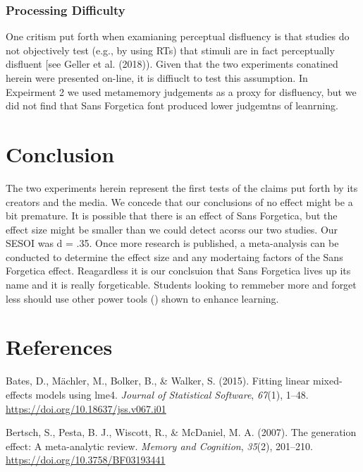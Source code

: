 \documentclass[english,doc]{apa6}
\begin{document}
\hypertarget{processing-difficulty}{%
\subsubsection{Processing Difficulty}\label{processing-difficulty}}

One critism put forth when examianing perceptual disfluency is that studies do not objectively test (e.g., by using RTs) that stimuli are in fact perceptually disfluent {[}see Geller et al. (2018)). Given that the two experiments conatined herein were presented on-line, it is diffiuclt to test this assumption. In Expeirment 2 we used metamemory judgements as a proxy for disfluency, but we did not find that Sans Forgetica font produced lower judgemtns of leanrning.

\hypertarget{conclusion}{%
\section{Conclusion}\label{conclusion}}

The two experiments herein represent the first tests of the claims put forth by its creators and the media. We concede that our conclusions of no effect might be a bit premature. It is possible that there is an effect of Sans Forgetica, but the effect size might be smaller than we could detect acorss our two studies. Our SESOI was d = .35. Once more research is published, a meta-analysis can be conducted to determine the effect size and any modertaing factors of the Sans Forgetica effect. Reagardless it is our conclsuion that Sans Forgetica lives up its name and it is really forgeticable. Students looking to remmeber more and forget less should use other power tools () shown to enhance learning.

\newpage

\hypertarget{references}{%
\section{References}\label{references}}

\begingroup
\setlength{\parindent}{-0.5in}
\setlength{\leftskip}{0.5in}

\hypertarget{refs}{}
\leavevmode\hypertarget{ref-Bates2015}{}%
Bates, D., Mächler, M., Bolker, B., \& Walker, S. (2015). Fitting linear mixed-effects models using lme4. \emph{Journal of Statistical Software}, \emph{67}(1), 1--48. \url{https://doi.org/10.18637/jss.v067.i01}

\leavevmode\hypertarget{ref-Bertsch2007}{}%
Bertsch, S., Pesta, B. J., Wiscott, R., \& McDaniel, M. A. (2007). The generation effect: A meta-analytic review. \emph{Memory and Cognition}, \emph{35}(2), 201--210. \url{https://doi.org/10.3758/BF03193441}
\end{document}
